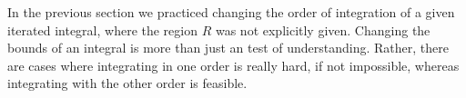 %

In the previous section we practiced changing the order of integration of a given iterated integral, where the region $R$ was not explicitly given. Changing the bounds of an integral is more than just an test of understanding. Rather, there are cases where integrating in one order is really hard, if not impossible, whereas integrating with the other order is feasible.\\

